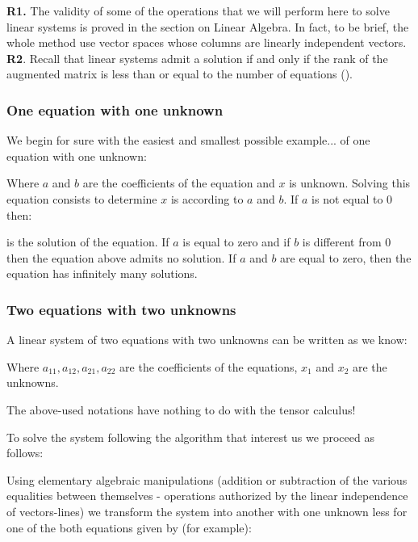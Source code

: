 	\begin{tcolorbox}[title=Remarks,colframe=black,arc=10pt]
	\textbf{R1.} The validity of some of the operations that we will perform here to solve linear systems is proved in the section on Linear Algebra. In fact, to be brief, the whole method use vector spaces whose columns are linearly independent vectors.\\

	\textbf{R2}. Recall that linear systems admit a solution if and only if the rank of the augmented matrix is less than or equal to the number of equations ().
	\end{tcolorbox}
	
	\subsubsection{One equation with one unknown}
	
	We begin for sure with the easiest and smallest possible example... of one equation with one unknown:
	
	Where $a$ and $b$ are the coefficients of the equation and $x$ is unknown. Solving this equation consists to determine $x$ is according to $a$ and $b$. If $a$ is not equal to $0$ then:
		
	is the solution of the equation. If $a$ is equal to zero and if $b$ is different from $0$ then the equation above admits no solution. If $a$ and $b$ are equal to zero, then the equation has infinitely many solutions.
	
	\subsubsection{Two equations with two unknowns}
	
	A linear system of two equations with two unknowns can be written as we know:
		
		Where $a_{11},a_{12},a_{21},a_{22}$ are the coefficients of the equations, $x_1$ and $x_2$ are the unknowns.
		
		\begin{tcolorbox}[title=Remark,colframe=black,arc=10pt]
The above-used notations have nothing to do with the tensor calculus!
		\end{tcolorbox}	
		
		To solve the system following the algorithm that interest us we proceed as follows:
		
		Using elementary algebraic manipulations (addition or subtraction of the various equalities between themselves - operations authorized by the linear independence of vectors-lines) we transform the system into another with one unknown less for one of the both equations given by (for example):
		
